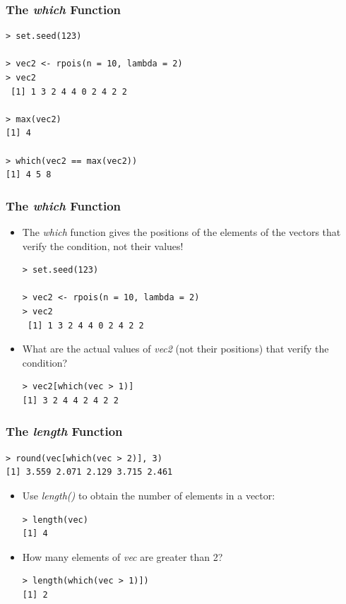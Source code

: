 \documentclass[xcolor=dvipsnames, xcolor=table]{beamer} %
\theoremstyle{mystyle}
\begin{document}
\begin{frame}[fragile]
\frametitle{The \textit{which} Function}

\begin{verbatim}
> set.seed(123)

> vec2 <- rpois(n = 10, lambda = 2)
> vec2
 [1] 1 3 2 4 4 0 2 4 2 2

> max(vec2)
[1] 4

> which(vec2 == max(vec2))
[1] 4 5 8
\end{verbatim} 
\end{frame}

\begin{frame}[fragile]
\frametitle{The \textit{which} Function}

\begin{itemize}

\item The \textit{which} function gives the positions of the elements of the vectors that verify the condition, not their values!

\begin{verbatim}
> set.seed(123)

> vec2 <- rpois(n = 10, lambda = 2)
> vec2
 [1] 1 3 2 4 4 0 2 4 2 2
\end{verbatim} 

\item What are the actual values of \textit{vec2} (not their positions) that verify the condition?

\begin{verbatim}
> vec2[which(vec > 1)]
[1] 3 2 4 4 2 4 2 2
\end{verbatim} 

\end{itemize}

\end{frame}

\begin{frame}[fragile] %
\frametitle{The \textit{length} Function}
\begin{verbatim}
> round(vec[which(vec > 2)], 3)
[1] 3.559 2.071 2.129 3.715 2.461
\end{verbatim}

\begin{itemize}

\item  Use \textit{length()} to obtain the number of elements in a vector:

\begin{verbatim}
> length(vec)
[1] 4
\end{verbatim}

\item How many elements of \textit{vec} are greater than 2?

\begin{verbatim}
> length(which(vec > 1)])
[1] 2
\end{verbatim}

\end{itemize}

\end{frame}
\end{document}
